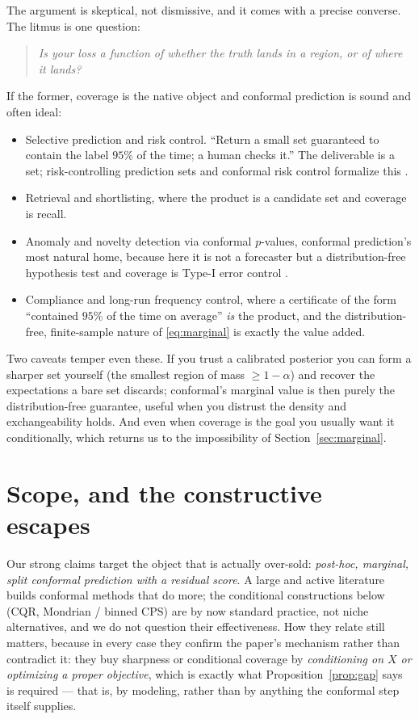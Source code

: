 \documentclass[11pt]{article}
\theoremstyle{definition}
\begin{document}
The argument is skeptical, not dismissive, and it comes with a precise converse. The
litmus is one question:
\begin{quote}
\emph{Is your loss a function of \emph{whether} the truth lands in a region, or of
\emph{where} it lands?}
\end{quote}
If the former, coverage is the native object and conformal prediction is sound and often
ideal:
\begin{itemize}
  \item Selective prediction and risk control. ``Return a small set guaranteed
  to contain the label $95\%$ of the time; a human checks it.'' The deliverable is a set;
  risk-controlling prediction sets and conformal risk control formalize this
  \citep{angelopoulos2021uncertainty, bates2021distribution, angelopoulos2024conformalrisk}.
  \item Retrieval and shortlisting, where the product is a candidate set and
  coverage is recall.
  \item Anomaly and novelty detection via conformal $p$-values, conformal
  prediction's most natural home, because here it is not a forecaster but a
  distribution-free hypothesis test and coverage is Type-I error control
  \citep{vovk2005algorithmic}.
  \item Compliance and long-run frequency control, where a certificate of the
  form ``contained $95\%$ of the time on average'' \emph{is} the product, and the
  distribution-free, finite-sample nature of \eqref{eq:marginal} is exactly the value
  added.
\end{itemize}
Two caveats temper even these. If you trust a calibrated posterior you can form a
sharper set yourself (the smallest region of mass $\ge 1-\alpha$) and recover the
expectations a bare set discards; conformal's marginal value is then purely the
distribution-free guarantee, useful when you distrust the density and exchangeability
holds. And even when coverage is the goal you usually want it conditionally, which
returns us to the impossibility of Section~\ref{sec:marginal}.

\section{Scope, and the constructive escapes}\label{sec:scope}

Our strong claims target the object that is actually over-sold: \emph{post-hoc, marginal,
split conformal prediction with a residual score}. A large and active literature builds
conformal methods that do more; the conditional constructions below (CQR, Mondrian / binned
CPS) are by now standard practice, not niche alternatives, and we do not question their
effectiveness. How they relate still matters, because in every case they confirm the paper's
mechanism rather than contradict it: they buy sharpness or conditional coverage by
\emph{conditioning on $X$ or optimizing a proper objective}, which is exactly what
Proposition~\ref{prop:gap} says is required --- that is, by modeling, rather than by anything
the conformal step itself supplies.
\end{document}
